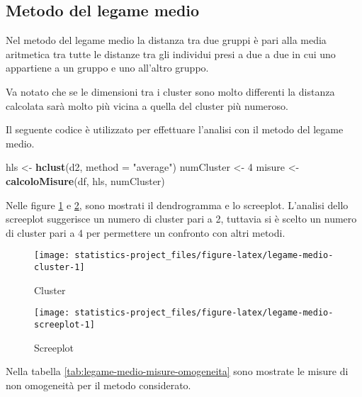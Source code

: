 \documentclass[]{book}
\newenvironment{Shaded}{\begin{snugshade}}{\end{snugshade}}
\newcommand{\KeywordTok}[1]{\textcolor[rgb]{0.13,0.29,0.53}{\textbf{#1}}}
\newcommand{\DataTypeTok}[1]{\textcolor[rgb]{0.13,0.29,0.53}{#1}}
\newcommand{\DecValTok}[1]{\textcolor[rgb]{0.00,0.00,0.81}{#1}}
\newcommand{\StringTok}[1]{\textcolor[rgb]{0.31,0.60,0.02}{#1}}
\newcommand{\NormalTok}[1]{#1}
\begin{document}
\subsection{Metodo del legame medio}\label{metodo-del-legame-medio}

Nel metodo del legame medio la distanza tra due gruppi è pari alla media
aritmetica tra tutte le distanze tra gli individui presi a due a due in
cui uno appartiene a un gruppo e uno all'altro gruppo.

Va notato che se le dimensioni tra i cluster sono molto differenti la
distanza calcolata sarà molto più vicina a quella del cluster più
numeroso.

Il seguente codice è utilizzato per effettuare l'analisi con il metodo
del legame medio.

\begin{Shaded}
\begin{Highlighting}[]
\NormalTok{hls <-}\StringTok{ }\KeywordTok{hclust}\NormalTok{(d2, }\DataTypeTok{method =} \StringTok{"average"}\NormalTok{)}
\NormalTok{numCluster <-}\StringTok{ }\DecValTok{4}
\NormalTok{misure <-}\StringTok{ }\KeywordTok{calcoloMisure}\NormalTok{(df, hls, numCluster)}
\end{Highlighting}
\end{Shaded}

Nelle figure \ref{fig:legame-medio-cluster} e
\ref{fig:legame-medio-screeplot}, sono mostrati il dendrogramma e lo
screeplot. L'analisi dello screeplot suggerisce un numero di cluster
pari a 2, tuttavia si è scelto un numero di cluster pari a 4 per
permettere un confronto con altri metodi.

\begin{figure}

{\centering \texttt{[image: statistics-project\_files/figure-latex/legame-medio-cluster-1]} 

}

\caption{Cluster}\label{fig:legame-medio-cluster}
\end{figure}\begin{figure}

{\centering \texttt{[image: statistics-project\_files/figure-latex/legame-medio-screeplot-1]} 

}

\caption{Screeplot}\label{fig:legame-medio-screeplot}
\end{figure}

Nella tabella \ref{tab:legame-medio-misure-omogeneita} sono mostrate le
misure di non omogeneità per il metodo considerato.
\end{document}

